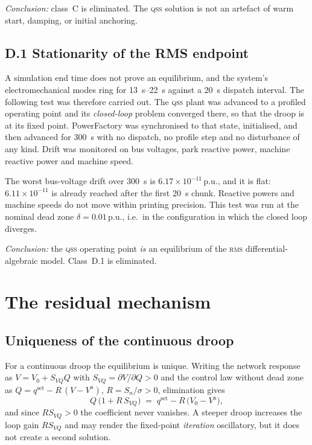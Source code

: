 \documentclass[11pt,a4paper]{article}
\newcommand{\pu}{\ensuremath{\mathrm{p.u.}}}
\newcommand{\qss}{\textsc{qss}}
\newcommand{\rms}{\textsc{rms}}
\begin{document}
\emph{Conclusion:} class~C is eliminated. The \qss{} solution is not an
artefact of warm start, damping, or initial anchoring.

\subsection{D.1 Stationarity of the RMS endpoint}
\label{sec:hold}

A simulation end time does not prove an equilibrium, and the system's
electromechanical modes ring for \SIrange{13}{22}{\second} against a
\SI{20}{\second} dispatch interval. The following test was therefore
carried out. The \qss{} plant was advanced to a profiled operating point and
its \emph{closed-loop} problem converged there, so that the droop is at its
fixed point. PowerFactory was synchronised to that state, initialised, and
then advanced for \SI{300}{\second} with no dispatch, no profile step and no
disturbance of any kind. Drift was monitored on bus voltages, park reactive
power, machine reactive power and machine speed.

The worst bus-voltage drift over \SI{300}{\second} is
$6.17\times10^{-11}\,\pu$, and it is flat: $6.11\times10^{-11}$ is already
reached after the first \SI{20}{\second} chunk. Reactive powers and machine
speeds do not move within printing precision. This test was run at the
nominal dead zone $\delta = 0.01\,\pu$, i.e.\ in the configuration in which
the closed loop diverges.

\emph{Conclusion:} the \qss{} operating point \emph{is} an equilibrium of
the \rms{} differential-algebraic model. Class~D.1 is eliminated.

\section{The residual mechanism}
\label{sec:mech}

\subsection{Uniqueness of the continuous droop}

For a continuous droop the equilibrium is unique. Writing the network
response as $V = V_0 + S_{VQ} Q$ with $S_{VQ} = \partial V/\partial Q > 0$
and the control law without dead zone as
$Q = q^{\mathrm{set}} - R\,(V - V^{\mathrm{a}})$, $R = S_n/\sigma > 0$,
elimination gives
%
\begin{equation}
  Q\,\big(1 + R\,S_{VQ}\big)
  \;=\;
  q^{\mathrm{set}} - R\,\big(V_0 - V^{\mathrm{a}}\big),
  \label{eq:unique}
\end{equation}
%
and since $R S_{VQ} > 0$ the coefficient never vanishes. A steeper droop
increases the loop gain $R S_{VQ}$ and may render the fixed-point
\emph{iteration} oscillatory, but it does not create a second solution.
\end{document}
